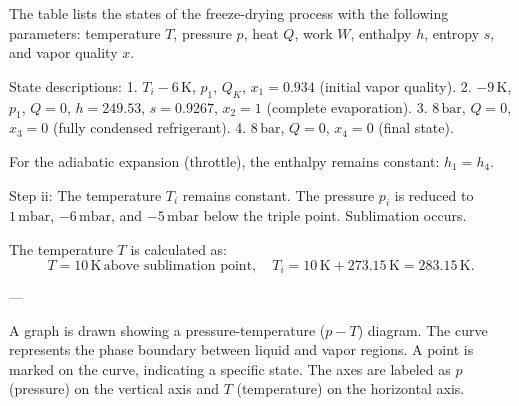 The table lists the states of the freeze-drying process with the following parameters: temperature \( T \), pressure \( p \), heat \( Q \), work \( W \), enthalpy \( h \), entropy \( s \), and vapor quality \( x \).  

State descriptions:  
1. \( T_i - 6 \, \text{K} \), \( p_1 \), \( Q_K \), \( x_1 = 0.934 \) (initial vapor quality).  
2. \( -9 \, \text{K} \), \( p_1 \), \( Q = 0 \), \( h = 249.53 \), \( s = 0.9267 \), \( x_2 = 1 \) (complete evaporation).  
3. \( 8 \, \text{bar} \), \( Q = 0 \), \( x_3 = 0 \) (fully condensed refrigerant).  
4. \( 8 \, \text{bar} \), \( Q = 0 \), \( x_4 = 0 \) (final state).  

For the adiabatic expansion (throttle), the enthalpy remains constant: \( h_1 = h_4 \).  

Step ii:  
The temperature \( T_i \) remains constant. The pressure \( p_i \) is reduced to \( 1 \, \text{mbar} \), \( -6 \, \text{mbar} \), and \( -5 \, \text{mbar} \) below the triple point. Sublimation occurs.  

The temperature \( T \) is calculated as:  
\[
T = 10 \, \text{K} \, \text{above sublimation point}, \quad T_i = 10 \, \text{K} + 273.15 \, \text{K} = 283.15 \, \text{K}.
\]

---

A graph is drawn showing a pressure-temperature (\( p-T \)) diagram. The curve represents the phase boundary between liquid and vapor regions. A point is marked on the curve, indicating a specific state. The axes are labeled as \( p \) (pressure) on the vertical axis and \( T \) (temperature) on the horizontal axis.